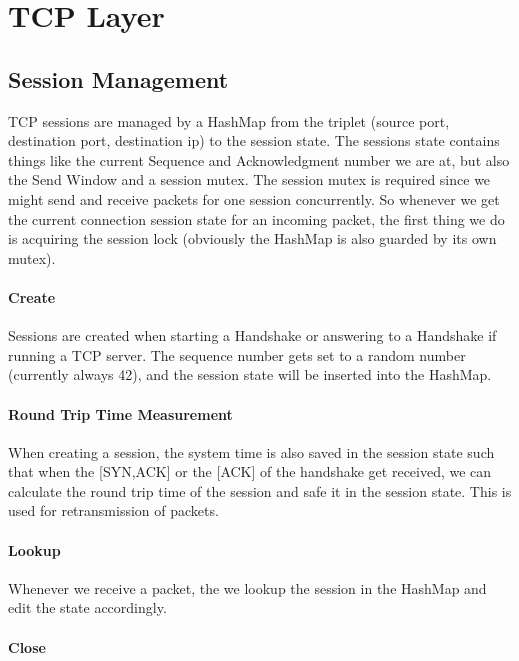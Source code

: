 \section{TCP Layer}

\subsection{Session Management}

TCP sessions are managed by a HashMap from the triplet (source port, destination port, destination ip) to the session state. The sessions state contains things like the current Sequence and Acknowledgment number we are at, but also the Send Window and a session mutex. The session mutex is required since we might send and receive packets for one session concurrently. So whenever we get the current connection session state for an incoming packet, the first thing we do is acquiring the session lock (obviously the HashMap is also guarded by its own mutex). 

\paragraph{Create}

Sessions are created when starting a Handshake or answering to a Handshake if running a TCP server. The sequence number gets set to a random number (currently always 42), and the session state will be inserted into the HashMap.

\paragraph{Round Trip Time Measurement}

When creating a session, the system time is also saved in the session state such that when the [SYN,ACK] or the [ACK] of the handshake get received, we can calculate the round trip time of the session and safe it in the session state. This is used for retransmission of packets. 

\paragraph{Lookup}

Whenever we receive a packet, the we lookup the session in the HashMap and edit the state accordingly.

\paragraph{Close}

